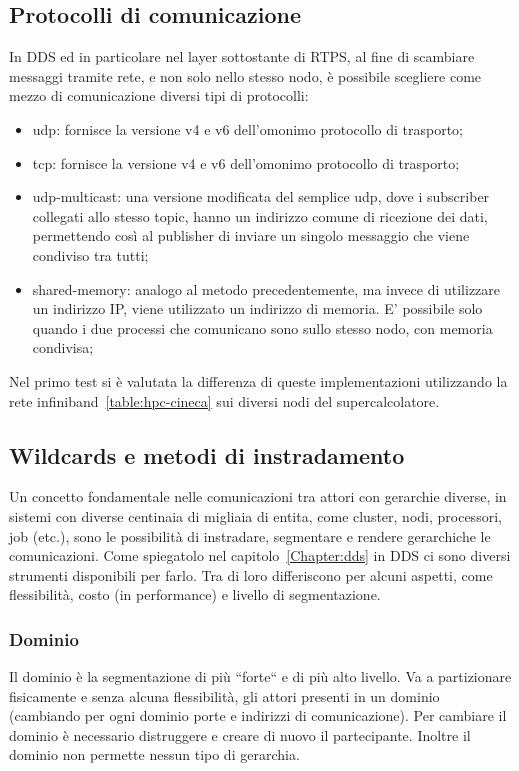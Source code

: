 \subsection{Protocolli di comunicazione}
In DDS ed in particolare nel layer sottostante di RTPS, al fine di scambiare messaggi tramite rete, e non solo nello stesso nodo, è possibile scegliere come mezzo di comunicazione diversi tipi di protocolli:
\begin{itemize}
    \item udp: fornisce la versione v4 e v6 dell'omonimo protocollo di trasporto;
    \item tcp: fornisce la versione v4 e v6 dell'omonimo protocollo di trasporto;
    \item udp-multicast: una versione modificata del semplice udp, dove i subscriber collegati allo stesso topic, hanno un indirizzo comune di ricezione dei dati, permettendo così al publisher di inviare un singolo messaggio che viene condiviso tra tutti;
    \item shared-memory: analogo al metodo precedentemente, ma invece di utilizzare un indirizzo IP, viene utilizzato un indirizzo di memoria. E' possibile solo quando i due processi che comunicano sono sullo stesso nodo, con memoria condivisa;
\end{itemize}

Nel primo test si è valutata la differenza di queste implementazioni utilizzando la rete infiniband~\ref{table:hpc-cineca} sui diversi nodi del supercalcolatore. 

\subsection{Wildcards e metodi di instradamento}
Un concetto fondamentale nelle comunicazioni tra attori con gerarchie diverse, in sistemi con diverse centinaia di migliaia di entita, come cluster, nodi, processori, job (etc.), sono le possibilità di instradare, segmentare e rendere gerarchiche le comunicazioni. Come spiegatolo nel capitolo~\ref{Chapter:dds} in DDS ci sono diversi strumenti disponibili per farlo. Tra di loro differiscono per alcuni aspetti, come flessibilità, costo (in performance) e livello di segmentazione.

\subsubsection{Dominio} 
Il dominio è la segmentazione di più ``forte`` e di più alto livello. Va a partizionare fisicamente e senza alcuna flessibilità, gli attori presenti in un dominio (cambiando per ogni dominio porte e indirizzi di comunicazione). Per cambiare il dominio è necessario distruggere e creare di nuovo il partecipante. Inoltre il dominio non permette nessun tipo di gerarchia.
    
